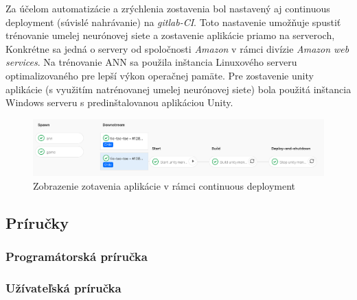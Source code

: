 Za účelom automatizácie a zrýchlenia zostavenia bol nastavený aj continuous deployment (súvislé nahrávanie) na
\emph{gitlab-CI}.
Toto nastavenie umožňuje spustiť trénovanie umelej neurónovej siete a zostavenie aplikácie priamo na serveroch,
Konkrétne sa jedná o servery od spoločnosti \emph{Amazon} v rámci divízie \emph{Amazon web services}.
Na trénovanie ANN sa použila inštancia Linuxového serveru optimalizovaného pre lepší výkon operačnej pamäte.
Pre zostavenie unity aplikácie (s využitím natrénovanej umelej neurónovej siete) bola použitá inštancia Windows
serveru s predinštalovanou aplikáciou Unity.
\begin{figure}[H]
    \centering
    \includegraphics[width=1\textwidth]{images/impl-cd.png}
    \caption{Zobrazenie zotavenia aplikácie v rámci continuous deployment}
\end{figure}\label{figure:cd}

\subsection{Príručky}\label{subsec:helpers}
\subsubsection{Programátorská príručka}
\subsubsection{Užívateľská príručka}
